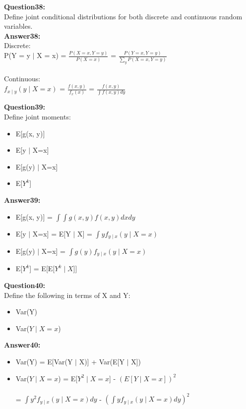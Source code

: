 \documentclass{article}
\begin{document}
\textbf{Question38:} \\
Define joint conditional distributions for both discrete and continuous random variables.
\\
\textbf{Answer38:}\\
Discrete:\\
P(Y = y $\mid$ X = x) = $\frac{P(X=x, Y=y)}{P(X=x)}$ = $\frac{P(Y=x, Y=y)}{\sum_y P(X=x, Y=y)}$
\\\\
Continuous:\\
$f_{x \mid y}(y \mid X=x)$ = $\frac{f(x, y)}{f_x(x)}$ = $\frac{f(x, y)}{\int f(x, y)dy}$


\textbf{Question39:} \\
Define joint moments:
\begin{itemize}
	\item E[g(x, y)]
	\item E[y $\mid$ X=x]
	\item E[g(y) $\mid$ X=x]
	\item E[$Y^k$]
\end{itemize}

\textbf{Answer39:}\\
\begin{itemize}
	\item E[g(x, y)] = $\int \int g(x,y)f(x,y)dxdy$
	\item E[y $\mid$ X=x] = E[Y $\mid$ X] = $\int yf_{y \mid x}(y \mid X=x)$
	\item E[g(y) $\mid$ X=x] = $\int g(y)f_{y \mid x}(y \mid X=x)$
	\item E[$Y^k$] = E[E[$Y^k \mid X$]]
\end{itemize}


\textbf{Question40:} \\
Define the following in terms of X and Y:
\begin{itemize}
	\item Var(Y) 
	\item Var($Y \mid X=x$)
\end{itemize}

\textbf{Answer40:}\\
\begin{itemize}
	\item Var(Y) = E[Var(Y $\mid$ X)] + Var(E[Y $\mid$ X])
	\item Var($Y \mid X=x$) = E[$Y^2 \mid X=x$] - $(E[Y \mid X=x])^2$
	\\\\
	 = $\int y^2 f_{y \mid x}(y \mid X=x)dy$ - $(\int y f_{y \mid x}(y \mid X=x)dy)^2$
\end{itemize}
\end{document}
